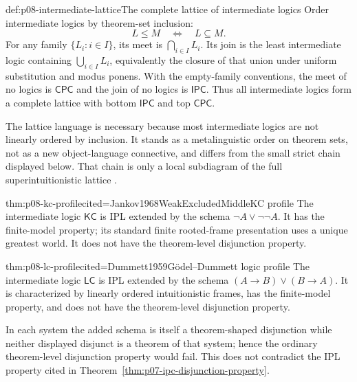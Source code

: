 \begin{hbdefinition}{def:p08-intermediate-lattice}{The complete lattice of intermediate logics}
Order intermediate logics by theorem-set inclusion:
\[
 L\leq M\quad\Longleftrightarrow\quad L\subseteq M.
\]
For any family \(\{L_i:i\in I\}\), its meet is
\(\bigcap_{i\in I}L_i\).  Its join is the least intermediate logic containing
\(\bigcup_{i\in I}L_i\), equivalently the closure of that union under uniform
substitution and modus ponens.  With the empty-family conventions, the meet of
no logics is \(\mathsf{CPC}\) and the join of no logics is \(\mathsf{IPC}\).
Thus all intermediate logics form a complete lattice with bottom
\(\mathsf{IPC}\) and top \(\mathsf{CPC}\).

The lattice language is necessary because most intermediate logics are not
linearly ordered by inclusion.  It stands as a metalinguistic order on theorem
sets, not as a new object-language connective, and differs from the small
strict chain displayed below.  That chain is only a local subdiagram of the
full superintuitionistic lattice
\cite{ChagrovZakharyaschev1997}.
\end{hbdefinition}

\begin{hbtheorem}{thm:p08-kc-profile}{cited=Jankov1968WeakExcludedMiddle}{KC profile}
The intermediate logic \(\mathsf{KC}\) is IPL extended by the schema
\(\neg A\lor\neg\neg A\).  It has the finite-model property; its standard
finite rooted-frame presentation uses a unique greatest world.  It does not
have the theorem-level disjunction property.
\end{hbtheorem}

\begin{hbtheorem}{thm:p08-lc-profile}{cited=Dummett1959}{G\"odel--Dummett logic profile}
The intermediate logic \(\mathsf{LC}\) is IPL extended by the schema
\((A\to B)\lor(B\to A)\).  It is characterized by linearly ordered
intuitionistic frames, has the finite-model property, and does not have the
theorem-level disjunction property.
\end{hbtheorem}

In each system the added schema is itself a theorem-shaped disjunction while
neither displayed disjunct is a theorem of that system; hence the ordinary
theorem-level disjunction property would fail.  This does not contradict the
IPL property cited in Theorem~\ref{thm:p07-ipc-disjunction-property}.

